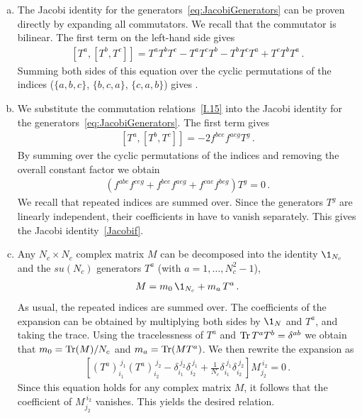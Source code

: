 \begin{enumerate}[a)]

\item The Jacobi identity for the generators~\eqref{eq:JacobiGenerators} can be proven directly by expanding all commutators. We recall that the commutator is bilinear.
The first term on the left-hand side gives
\begin{align}
\left[T^{a}, [ T^{b}, T^{c}]\right]  = T^a T^b T^c - T^a T^c T^b - T^b T^c T^a + T^c T^b T^a \,.
\end{align}
Summing both sides of this equation over the cyclic permutations of the indices ($\{a,b,c\}$, $\{b,c,a\}$, $\{c,a,b\}$) gives .

\smallskip
\item We substitute the commutation relations~\eqref{I.15} into the Jacobi identity for the generators~\eqref{eq:JacobiGenerators}. The first term gives
\begin{align}
\left[T^{a}, [ T^{b}, T^{c}]\right] = - 2 f^{bce} f^{aeg} T^{g} \,.
\end{align}
By summing over the cyclic permutations of the indices and removing the overall constant factor we obtain
\begin{align} \label{eq:jacobiproof}
\left(f^{abe} f^{ceg} + f^{bce} f^{aeg} + f^{cae} f^{beg} \right) T^{g} = 0 \,.
\end{align}
We recall that repeated indices are summed over. Since the generators $T^{g}$ are linearly independent, their coefficients in  have to vanish separately. This gives the Jacobi identity~\eqref{Jacobif}.

\smallskip
\item Any $N_c \times N_c$ complex matrix $M$ can be decomposed into the identity $\1_{N_c}$ and the $su(N_c)$ generators $T^a$ (with $a=1,\ldots, N_c^2-1$),
\begin{align}
M = m_0 \, \1_{N_c} + m_a \, T^a \,.
\end{align}
As usual, the repeated indices are summed over. The coefficients of the expansion can be obtained by multiplying both sides by $\1_{N}$ and $T^a$, and taking the trace. Using the tracelessness of $T^a$ and $\mathop{\mathrm{Tr}} T^a T^b = \delta^{ab}$ we obtain that $m_0 = \mathop{\mathrm{Tr}}(M)/N_c$ and $m_a = \mathop{\mathrm{Tr}} (M T^a)$. We then rewrite the expansion as 
\begin{align}
\left[ \left(T^a\right)_{i_1}^{\ j_1} \left(T^a\right)_{i_2}^{\ j_2} - \delta_{i_1}^{\ j_2} \delta_{i_2}^{\ j_1}  + \frac{1}{N_c} \delta_{i_1}^{\ j_1} \delta_{i_2}^{\ j_2}  \right] M_{j_2}^{\ i_2} = 0\,.
\end{align}
Since this equation holds for any complex matrix $M$, it follows that the coefficient of $M_{j_2}^{\ i_2}$ vanishes. This yields the desired relation.

\end{enumerate}

